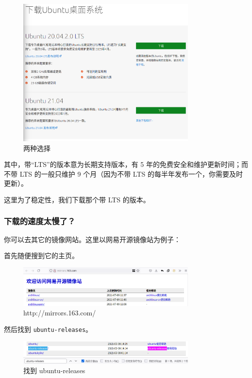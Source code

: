 \documentclass[UTF-8]{ctexart}
\begin{document}
				\begin{figure}[H]
					\centering
					\includegraphics[width=0.8\textwidth]{fig/download_ubuntu_which.png}
					\caption*{两种选择}
				\end{figure}
			
				其中，带“LTS”的版本意为长期支持版本，有 5 年的免费安全和维护更新时间；而不带 LTS 的一般只维护 9 个月（因为不带 LTS 的每半年发布一个，你需要及时更新）。
				
				这里为了稳定性，我们下载那个带 LTS 的版本。
			
			\subsubsection{下载的速度太慢了？}
			
				你可以去其它的镜像网站。这里以网易开源镜像站为例子：
				
				首先随便搜到它的主页。
				
				\begin{figure}[H]
					\centering
					\includegraphics[width=0.8\textwidth]{fig/mirrors163com.png}
					\caption*{http://mirrors.163.com/}
				\end{figure}
			
				然后找到 \texttt{ubuntu-releases}。
				
				\begin{figure}[H]
					\centering
					\includegraphics[width=0.8\textwidth]{fig/mirrors163com_find.png}
					\caption*{找到 ubuntu-releases}
				\end{figure}
				
\end{document}
